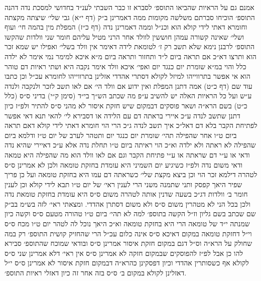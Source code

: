 \documentclass[12pt, openany]{book}
\begin{document}
\begin{multicols}{2}
אמנם גם על הראיות שהביאו התוספ׳ לסברא זו כבר השבתי לענ״ד בחדושי למסכת נדה דהנה התוספ׳ הוכיחו סברתם משלשה מקומות ממה דאמרינן ב״ק (דף י״א) גבי שלי׳ שיצתה מקצתה וחומרא דאתי לידי קולא הוא וכנ״ל וממה דאמרינן נדה (דף כ״ז) המפלת מין בהמה חי׳ ועוף ושלי׳ שאינה קשורה עמהן חוששין לוולד אחר הרני מטיל עליהם חומר שני וולדות שהקשו התוספ׳ לרבנן נימא שלא תשב רק ז׳ לטומאת לידה דאימר אין וולד בשלי׳ ואפילו יש שמא זכר הוא ותרצו דא״כ אם תראה ביום ל״ד ותחזור ותראה ביום מ״א איכא למימר נמי אימר לא ילדה כלל והוי במ״א שומרת יום כנגד יום ואפי׳ איכא וולד אימר נקבה היא ושתי ראיות דם טוהר הוא אי אפשר בתרווייהו למיזל לקולא דסתרי אהדדי אזלינן בתרווייהו לחומרא עכ״ל וכן כתבו עוד שם (דף כ״ט) אמה דתנן המפלת ואין ידוע אם וולד הי׳ אם לאו תשב לזכר ולנקבה ולנדה ע״ש ועל כל הראיות האלה יש להשיב ע״פ מה שכתב הש״ך בי״ד (סימן ק״י) בדיני ס״ס (כלל כ״ט) בשם הרא״ה ושאר פוסקים דבמקום שיש חזקת איסור לא מהני ס״ס להתיר ולפ״ז כיון דתנן שתשב לנדה ע״כ איירי בראתה דם עם הלידה או דסבירא לי׳ להאי תנא דאי אפשר לפתיחת הקבר בלא דם דאל״כ איך תשב לנדה ג״כ הרי הוי חומרא דאתי לידי קולא דאם תראה ביום ט״ו אחר שהפילה תהי׳ שומרת יום כנגד יום ותטהר לערב של יום ט״ז ודלמא ביום שהפילה לא ראתה ולא ילדה וא״כ הוי ראיתה ביום ט״ו תחלת נדה אלא ע״כ דאיירי שהיא נדה ודאי או ע״י דם שראתה או ע״י פתיחת הקבר וגם אם לאו וולד הוא מה שהפילה היא טמאה ודאי משום נדה ולפ״ז כשיגיע יום השמיני היא עומדת בחזקת טומאה ולכן לא אמרינן ס״ס לטהרה דילמא זכר הוי וכן ביצא מקצת שלי׳ כשראתה דם עמו היא בחזקת טומאה ועל כן פריך שפיר היאך קפסק ותני שתמנה משני הרי לענין ראי׳ של יום ט״ו תבא לידי קולא וכן לענין חומר ב׳ וולדות דג״כ בשעה שדנין אותה לטהרה משום ס״ס היא עומדת בחזקת טומאת נדה ולכן בכל הני לא מטהרין משום ס״ס ולא משום דסתרן אהדדי. ומצאתי ראי׳ לזה בש״מ בב״ק שם שכתב בשם גליון וז״ל הקשה בתוספ׳ למה לא תהי׳ ביום ט״ו טהורה מטעם ס״ס וקשה כיון שמנתה י״ד של טומאה הרי היא בחזקת טומאה וא״כ היאך נוכל לה לטהר יום ט״ו מכח ס״ס וי״ל דחזקת טומאה במקום דאיכא ס״ס אינה כלום עכ״ל הרי שהחזיק קושית התוספ׳ רק במה שחולק על הרא״ה וס״ל דגם במקום חזקת איסור אמרינן ס״ס ובודאי שמוכח שהתוספ׳ סבירא להו כן אבל לפ״ז להפוסקים שבמקום חזקה לא אמרינן ס״ס אין ראי׳ דלא אמרינן שני ס״ס לקולא אף כשסותרין אהדדי וכיון דפסקינן כהרא״ה דבמקום חזקת איסור לא אמרינן ס״ס י״ל דאזלינן לקולא במקום ב׳ ס״ס בזה אחר זה כיון דאזלי ראיות התוספ׳.\\\vspace{0pt}


\end{multicols}
\end{document}
